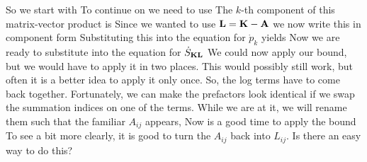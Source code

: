 So we start with 
To continue on we need to use 
The $k$-th component of this matrix-vector product is 
Since we wanted to use ${\bf L}={\bf K}-{\bf A}$ we now write this in component form 
Substituting this into the equation for $\dot{p}_k$ yields
Now we are ready to substitute into the equation for $\dot{S}_{\bf KL}$
We could now apply our bound, but we would have to apply it in two places. This would possibly still work, but often it is a better idea to apply it only once. So, the log terms have to come back together. Fortunately, we can make the prefactors look identical if we swap the summation indices on one of the terms. While we are at it, we will rename them such that the familiar $A_{ij}$ appears,
Now is a good time to apply the bound 
To see a bit more clearly, it is good to turn the $A_{ij}$ back into $L_{ij}$. Is there an easy way to do this?


